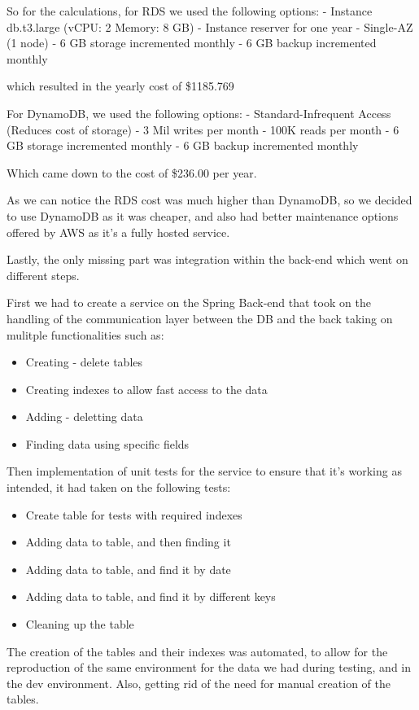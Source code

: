 So for the calculations, for RDS we used the following options:
- Instance db.t3.large (vCPU: 2 Memory: 8 GB)
- Instance reserver for one year 
- Single-AZ (1 node)
- 6 GB storage incremented monthly
- 6 GB backup incremented monthly

which resulted in the yearly cost of \$1185.769

For DynamoDB, we used the following options:
- Standard-Infrequent Access (Reduces cost of storage)
- 3 Mil writes per month
- 100K reads per month
- 6 GB storage incremented monthly
- 6 GB backup incremented monthly

Which came down to the cost of \$236.00 per year.

As we can notice the RDS cost was much higher than DynamoDB,
so we decided to use DynamoDB as it was cheaper, and also had
better maintenance options offered by AWS as it's a fully hosted
service.

Lastly, the only missing part was integration within the back-end which went on different steps.

First we had to create a service on the Spring Back-end that took on the handling of the communication layer between the DB and the back taking on mulitple functionalities such as:
    \begin{itemize}
        \item Creating - delete tables
        \item Creating indexes to allow fast access to the data
        \item Adding - deletting data
        \item Finding data using specific fields
    \end{itemize}

Then implementation of unit tests for the service to ensure that it's working as intended,
it had taken on the following tests:
    \begin{itemize}
        \item Create table for tests with required indexes
        \item Adding data to table, and then finding it
        \item Adding data to table, and find it by date
        \item Adding data to table, and find it by different keys
        \item Cleaning up the table
    \end{itemize}

The creation of the tables and their indexes was automated, to allow for the
reproduction of the same environment for the data we had during testing, and in the 
dev environment. Also, getting rid of the need for manual creation of the tables.

